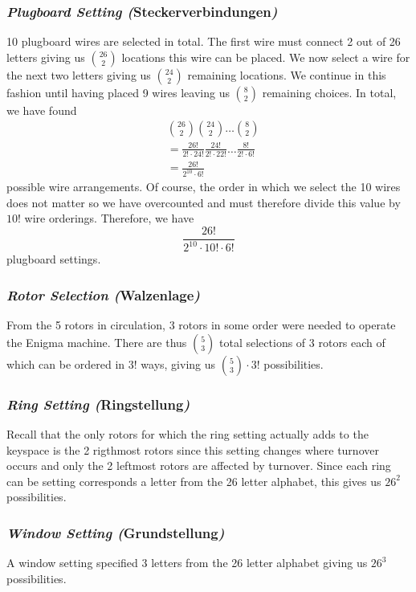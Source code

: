 \subsubsection{\emph{Plugboard Setting (}Steckerverbindungen\emph{)}}
10 plugboard wires are selected in total. The first wire must connect 2 out of 26 letters giving us ${26\choose2}$ locations this wire can be placed. We now select a wire for the next two letters giving us ${24\choose2}$ remaining locations. We continue in this fashion until having placed 9 wires leaving us ${8\choose2}$ remaining choices. In total, we have found
\begin{align*}
	 & {26\choose2}{24\choose2}\dots{8\choose2}                                  \\
	 & =\frac{26!}{2!\cdot 24!}\frac{24!}{2!\cdot 22!}\dots\frac{8!}{2!\cdot 6!} \\
	 & =\frac{26!}{2^10\cdot6!}
\end{align*}
possible wire arrangements. Of course, the order in which we select the 10 wires does not matter so we have overcounted and must therefore divide this value by $10!$ wire orderings. Therefore, we have
\[
	\frac{26!}{2^10\cdot 10! \cdot 6!}
\]
plugboard settings.

\subsubsection{\emph{Rotor Selection (}Walzenlage\emph{)}}
From the 5 rotors in circulation, 3 rotors in some order were needed to operate the Enigma machine. There are thus ${5}\choose{3}$ total selections of 3 rotors each of which can be ordered in $3!$ ways, giving us ${5\choose3}\cdot{3!}$ possibilities.

\subsubsection{\emph{Ring Setting (}Ringstellung\emph{)}}
Recall that the only rotors for which the ring setting actually adds to the keyspace is the 2 rigthmost rotors since this setting changes where turnover occurs and only the 2 leftmost rotors are affected by turnover. Since each ring can be setting corresponds a letter from the 26 letter alphabet, this gives us $26^2$ possibilities.

\subsubsection{\emph{Window Setting (}Grundstellung\emph{)}}
A window setting specified 3 letters from the 26 letter alphabet giving us $26^3$ possibilities.

